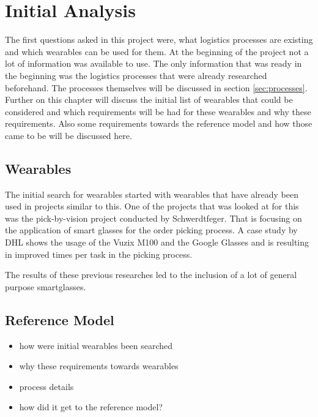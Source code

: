 \chapter{Initial Analysis}\label{cha:initialAnalysis}
The first questions asked in this project were, what logistics processes are existing and which wearables can be used for them. At the beginning of the project not a lot of information was available to use. The only information that was ready in the beginning was the logistics processes that were already researched beforehand. The processes themselves will be discussed in section \ref{sec:processes}. Further on this chapter will discuss the initial list of wearables that could be considered and which requirements will be had for these wearables and why these requirements. Also some requirements towards the reference model and how those came to be will be discussed here.

\section{Wearables}
The initial search for wearables started with wearables that have already been used in projects similar to this. One of the projects that was looked at for this was the pick-by-vision project conducted by Schwerdtfeger. \citep{phdthesis:pickByVision} That is focusing on the application of smart glasses for the order picking process. A case study by DHL shows the usage of the Vuzix M100 and the Google Glasses and is resulting in improved times per task in the picking process. \citep{caseStudy:dhlWearables} 

The results of these previous researches led to the inclusion of a lot of general purpose smartglasses. 

\section{Reference Model}


\begin{itemize}
	\item how were initial wearables been searched
	\item why these requirements towards wearables
	\item process details
	\item how did it get to the reference model?
\end{itemize}